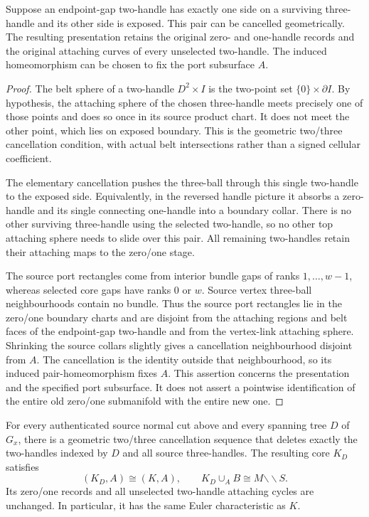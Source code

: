 \begin{lemma}
\label{lem:cut-dual-relative}
Suppose an endpoint-gap two-handle has exactly one side on a surviving
three-handle and its other side is exposed.  This pair can be cancelled
geometrically.  The resulting presentation retains the original zero-
and one-handle records and the original attaching curves of every
unselected two-handle.  The induced homeomorphism can be chosen to fix
the port subsurface $A$.
\end{lemma}

\begin{proof}
The belt sphere of a two-handle $D^2\times I$ is the two-point set
$\{0\}\times\partial I$.  By hypothesis, the attaching sphere of the
chosen three-handle meets precisely one of those points and does so once
in its source product chart.  It does not meet the other point, which
lies on exposed boundary.  This is the geometric two/three cancellation
condition, with actual belt intersections rather than a signed cellular
coefficient.

The elementary cancellation pushes the three-ball through this single
two-handle to the exposed side.  Equivalently, in the reversed handle
picture it absorbs a zero-handle and its single connecting one-handle
into a boundary collar.  There is no other surviving three-handle using
the selected two-handle, so no other top attaching sphere needs to slide
over this pair.  All remaining two-handles retain their attaching maps
to the zero/one stage.

The source port rectangles come from interior bundle gaps of ranks $1,\ldots,w-1$, whereas selected core gaps have ranks $0$ or $w$. Source vertex three-ball neighbourhoods contain no bundle. Thus the source port rectangles lie in the zero/one boundary charts and are
disjoint from the attaching regions and belt faces of the endpoint-gap
two-handle and from the vertex-link attaching sphere.  Shrinking the
source collars slightly gives a cancellation neighbourhood disjoint
from $A$.  The cancellation is the identity outside that neighbourhood,
so its induced pair-homeomorphism fixes $A$.  This assertion concerns the
presentation and the specified port subsurface.  It does not assert a
pointwise identification of the entire old zero/one submanifold with the
entire new one.
\end{proof}

\begin{theorem}
\label{thm:cut-dual-complete}
For every authenticated source normal cut above and every spanning tree
$D$ of $G_x$, there is a geometric two/three cancellation sequence that
deletes exactly the two-handles indexed by $D$ and all source three-handles.
The resulting core $K_D$ satisfies
\[
  (K_D,A)\cong(K,A),\qquad
  K_D\cup_A B\cong M\mathbin{\backslash\!\backslash}S.
\]
Its zero/one records and all unselected two-handle attaching cycles are
unchanged.  In particular, it has the same Euler characteristic as $K$.
\end{theorem}

